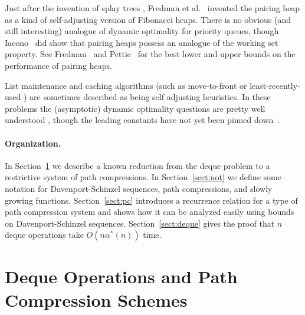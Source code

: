 \documentclass{article}
\begin{document}
Just after the invention of splay trees \cite{ST85}, Fredman et al.~\cite{F+86} invented the pairing heap
as a kind of self-adjusting version of Fibonacci heaps.  There is no obvious (and still interesting) analogue of dynamic optimality
for priority queues, though Iacono~\cite{Iac00} did show that pairing heaps possess an analogue of the working set property.
See Fredman~\cite{F99} and Pettie~\cite{Pet05a} for the best lower and upper bounds on the performance of pairing heaps.

List maintenance and caching algorithms (such as move-to-front or least-recently-used \cite{ST85b}) 
are sometimes described as being self adjusting heuristics.  In these problems the (asymptotic) dynamic optimality
questions are pretty well understood \cite{ST85b}, though the leading constants have not yet been pinned down~\cite{Albers98,ASW95}.

\paragraph{Organization.} In Section~\ref{sect:equiv} we describe a known reduction \cite{Tar85,Sundar92,Lucas91} 
from the deque problem to a restrictive system of path compressions.  In Section~\ref{sect:not} we define
some notation for Davenport-Schinzel sequences, path compressions, and slowly growing functions.
Section~\ref{sect:pc} introduces a recurrence relation for a type of path compression system and shows how
it can be analyzed easily using bounds on Davenport-Schinzel sequences.  Section~\ref{sect:deque}
gives the proof that $n$ deque operations take $O(n\alpha^*(n))$ time.


\section{Deque Operations and Path Compression Schemes}\label{sect:equiv}
\end{document}
